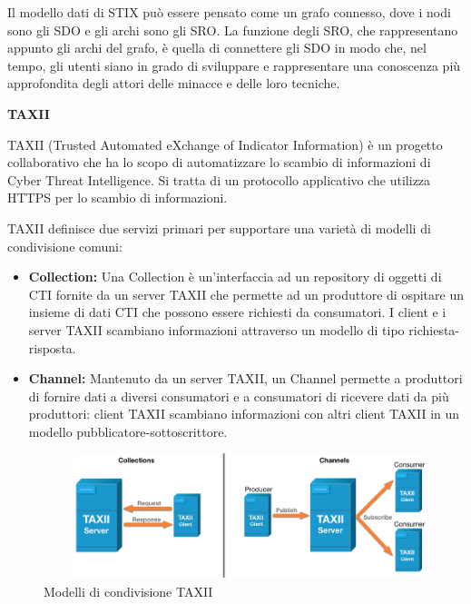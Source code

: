 \newpage

Il modello dati di STIX può essere pensato come un grafo connesso, dove i nodi sono gli SDO e gli archi sono gli SRO. La funzione degli SRO, che rappresentano appunto gli archi del grafo, è quella di connettere gli SDO in modo che, nel tempo, gli utenti siano in grado di sviluppare e rappresentare una conoscenza più approfondita degli attori delle minacce e delle loro tecniche.\newline



\textbf{TAXII}\newline

TAXII (Trusted Automated eXchange of Indicator Information) è un progetto collaborativo che ha lo scopo di automatizzare lo scambio di informazioni di Cyber Threat Intelligence. Si tratta di un protocollo applicativo che utilizza HTTPS per lo scambio di informazioni.\par

TAXII definisce due servizi primari per supportare una varietà di modelli di condivisione comuni:



\begin{itemize}
    \item\textbf{Collection:} Una Collection è un’interfaccia ad un repository di oggetti di CTI fornite da un server TAXII che permette ad un produttore di ospitare un insieme di dati CTI che possono essere richiesti da consumatori. I client e i server TAXII scambiano informazioni attraverso un modello di tipo richiesta-risposta.
    \item\textbf{Channel:} Mantenuto da un server TAXII, un Channel permette a produttori di fornire dati a diversi consumatori e a consumatori di ricevere dati da più produttori: client TAXII scambiano informazioni con altri client TAXII in un modello pubblicatore-sottoscrittore.
\end{itemize} 

 \begin{figure}[h]
    \begin{center}
    \includegraphics[width=0.90\columnwidth]{images/3_CTI_img/modelloTAXII.png}
    \end{center}
    \caption{Modelli di condivisione TAXII}
    \label{fig:Modelli di condivisione TAXII}
    \end{figure}
    
